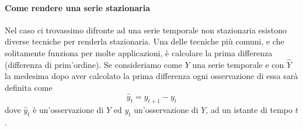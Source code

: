 \paragraph{Come rendere una serie stazionaria}
Nel caso ci trovassimo difronte ad una serie temporale non stazionaria esistono diverse
tecniche per renderla stazionaria. Una delle tecniche più comuni, e che solitamente funziona per molte
applicazioni, è calcolare la prima differenza (differenza di prim'ordine). Se consideriamo
come $Y$ una serie temporale e con $\hat{Y}$ la medesima dopo aver calcolato la prima 
differenza ogni osservazione di essa sarà definita come
\[ \hat{y}_t = y_{t+1} - y_t \]
dove $\hat{y}_t$ è un'osservazione di $\hat{Y}$ ed $y_{t}$ un'osservazione di $Y$, ad un istante
di tempo $t$.
